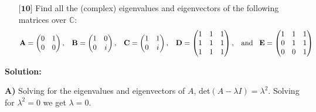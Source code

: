 \documentclass[12pt]{article}
\begin{document}
\begin{itemize}
\begin{itemize}
    \end{itemize}
    
    
    \item[$\textbf{[10]}$]
    Find all the (complex) eigenvalues and eigenvectors of the following matrices over $\mathbb{C}$:
    \begin{equation*}
    \mathbf{A} = \begin{pmatrix}
    0 & 1 \\
    0 & 0
    \end{pmatrix}, \hspace{.3cm} \mathbf{B} = \begin{pmatrix}
    1 & 0 \\
    0 & i
    \end{pmatrix}, \hspace{.3cm} \mathbf{C} = \begin{pmatrix}
    1 & 1 \\
    0 & i
    \end{pmatrix}, \hspace{.3cm} \mathbf{D} = \begin{pmatrix}
    1 & 1 & 1 \\
    1 & 1 & 1 \\
    1 & 1 & 1
    \end{pmatrix}, \hspace{.3cm} \text{and} \hspace{.3cm} \mathbf{E} = \begin{pmatrix}
    1 & 1 & 1 \\
    0 & 1 & 1 \\
    0 & 0 & 1
    \end{pmatrix}
    \end{equation*}
    
    \end{itemize}

    \textbf{Solution:}

    \textbf{A)} Solving for the eigenvalues and eigenvectors of $A$, det$(A - \lambda I) = \lambda^2$. Solving for $\lambda^2 = 0$ we get $\lambda = 0$. 
\end{document}
